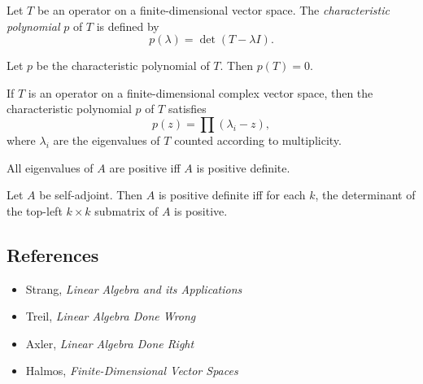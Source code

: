 \begin{defn}
  Let $T$ be an operator on a finite-dimensional vector space. The
  \emph{characteristic polynomial} $p$ of $T$ is defined by
  \[p(\lambda)=\det(T-\lambda I).\]
\end{defn}
\begin{thm}
  Let $p$ be the characteristic polynomial of $T$. Then $p(T)=0$.
\end{thm}
\begin{prop}
  If $T$ is an operator on a finite-dimensional complex vector space, then the
  characteristic polynomial $p$ of $T$ satisfies
  \[p(z)=\prod(\lambda_i-z),\]
  where $\lambda_i$ are the eigenvalues of $T$ counted according to
  multiplicity.
\end{prop}
\begin{cor}
  All eigenvalues of $A$ are positive iff $A$ is positive definite.
\end{cor}
\begin{prop}
  Let $A$ be self-adjoint. Then $A$ is positive definite iff 
    for each $k$, the determinant of the top-left $k\times k$ submatrix of
      $A$ is positive.
\end{prop}
\subsection*{References}
\begin{itemize}
    \item Strang, \emph{Linear Algebra and its Applications}
    \item Treil, \emph{Linear Algebra Done Wrong}
    \item Axler, \emph{Linear Algebra Done Right}
    \item Halmos, \emph{Finite-Dimensional Vector Spaces}
\end{itemize}
